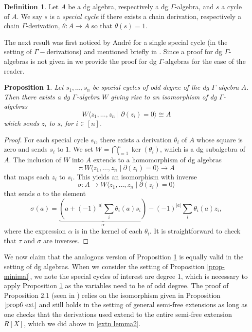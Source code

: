 \documentclass{amsart}
\newtheorem{prop}[theorem]{Proposition}
\theoremstyle{definition}
\newtheorem{defn}[theorem]{Definition}
\theoremstyle{remark}
\begin{document}
 \begin{defn}
     Let $A$ be a dg algebra, respectively a dg $\Gamma$-algebra, and $s$ a cycle of $A$. We say $s$ is a \textit{special cycle} if there exists a chain derivation, respectively a chain $\Gamma$-derivation, $\theta:A\to A$ so that $\theta(s)=1$.
 \end{defn}

 The next result was first noticed by André for a single special cycle (in the setting of $\Gamma-$derivations) and mentioned briefly in \cite{Iyengar2001}. Since a proof for dg $\Gamma$-algebras is not given in \cite{Iyengar2001} we provide the proof for dg $\Gamma$-algebras for the ease of the reader.


\begin{prop}
\label{prop6 ext}
    Let $s_1,\ldots, s_n$ be special cycles of odd degree of the dg $\Gamma$-algebra $A$. Then there exists a dg $\Gamma$-algebra $W$ giving rise to an isomorphism of dg $\Gamma$-algebras $$W\langle z_1, \ldots, z_n \mid \partial(z_i)=0 \rangle \cong A$$ which sends $z_i$ to $s_i$ for  $i \in [n]$.
\end{prop}
\begin{proof}
    For each special cycle $s_i$, there exists a derivation $\theta_i$ of $A$ whose square is zero and sends $s_i$ to 1. We set $W = \bigcap_{i=1}^{n} \ker(\theta_i)$, which is a dg subalgebra of $A$. The inclusion of $W$ into $A$ extends to a homomorphism of dg algebras 
    \[
    \tau: W\langle z_1, \ldots, z_n \mid \partial(z_i)=0 \rangle \to A
    \]
    that  maps each $z_i$ to $s_i$. This yields an isomorphism with inverse
    \[ 
    \sigma: A \to W\langle z_1, \ldots, z_n \mid \partial(z_i)=0 \rangle
    \]
    that sends $a$ to the element
    \[
    \sigma(a)= \underbrace{(a + (-1)^{|a|} \sum_{i}\theta_i(a)s_i)}_{\alpha} - (-1)^{|a|} \sum_i \theta_i(a)z_i,
    \]
    where the expression $\alpha$ is in the kernel of each $\theta_i$.
    It is straightforward to check that $\tau$ and $\sigma$ are inverses.
\end{proof}

  We now claim that the analogous version of Proposition \ref{prop6 ext} is equally valid in the setting of dg algebras. When we consider the setting of Proposition \ref{prop-minimal}, we note the special cycles of interest are degree 1, which is necessary to apply Proposition \ref{prop6 ext} as the variables need to be of odd degree. The proof of Proposition 2.1 (seen in \cite{Iyengar2001}) relies on the isomorphism given in Proposition $\ref{prop6 ext}$ and still holds in the setting of general semi-free extensions as long as one checks that the derivations used extend to the entire semi-free extension $R[X]$, which we did above in \cref{extn lemma2}. 
\end{document}
